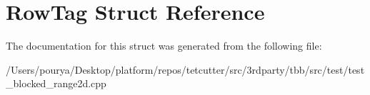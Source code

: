 \hypertarget{structRowTag}{}\section{Row\+Tag Struct Reference}
\label{structRowTag}


The documentation for this struct was generated from the following file\+:\begin{DoxyCompactItemize}
\item 
/\+Users/pourya/\+Desktop/platform/repos/tetcutter/src/3rdparty/tbb/src/test/test\+\_\+blocked\+\_\+range2d.\+cpp\end{DoxyCompactItemize}
